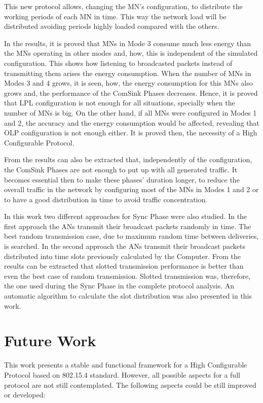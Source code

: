 This new protocol allows, changing the \ac{MN}'s configuration, to distribute the working periods of each \ac{MN} in time. This way the network
load will be distributed avoiding periods highly loaded compared with the others.

In the results, it is proved that \acp{MN} in Mode 3 consume much less energy than the \acp{MN} operating in other modes and, how,
this is independent of the simulated configuration. This shows how listening to broadcasted packets instead of transmitting them arises
the energy consumption. When the number of \acp{MN} in Modes 3 and 4 grows, it is seen, how, the energy consumption 
for this \acp{MN} also grows and, the performance of the ComSink Phases decreases. Hence, it is proved that \ac{LPL} configuration is not enough
for all situations, specially when the number of \acp{MN} is big. On the other hand, if all \acp{MN} were configured in Modes 1 and 2, the accuracy
and the energy consumption would be affected, revealing that \ac{OLP} configuration is not enough either. It is proved then, the necessity of
a High Configurable Protocol.

From the results can also be extracted that, independently of the configuration, the ComSink Phases are not enough to put up with all generated 
traffic. It becomes essential then to make these phases' duration longer, to reduce the overall traffic in the network by configuring most of 
the \acp{MN} in Modes 1 and 2 or to have a good distribution in time to avoid traffic concentration.

In this work two different approaches for Sync Phase were also studied. In the first approach the \acp{AN} transmit their broadcast packets randomly
in time. The best random transmission case, due to maximum random time between deliveries, is searched. In the second approach the \acp{AN} transmit
their broadcast packets distributed into time slots previously calculated by the Computer. From the results can be extracted that slotted 
transmission performance is better than even the best case of random transmission. Slotted transmission was, therefore, the one used during 
the Sync Phase in the complete protocol analysis. An automatic algorithm to calculate the slot distribution was also presented in this work.


\section{Future Work}

This work presents a stable and functional framework for a High Configurable Protocol based on 802.15.4 standard. However, all possible aspects
for a full protocol are not still contemplated. The following aspects could be still improved or developed:

